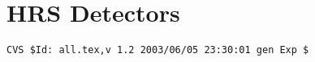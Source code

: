 \chapter{HRS Detectors}
\graphicspath{{hrs_det/figs/}}
\renewcommand{\dirfig}[0]{hrs_det/figs}
\renewcommand{\dircur}[0]{hrs_det}


\newpage

\newpage

\newpage

\newpage

\newpage

\newpage

\newpage


%
%
{\small
\begin{verbatim}CVS $Id: all.tex,v 1.2 2003/06/05 23:30:01 gen Exp $\end{verbatim}
}
